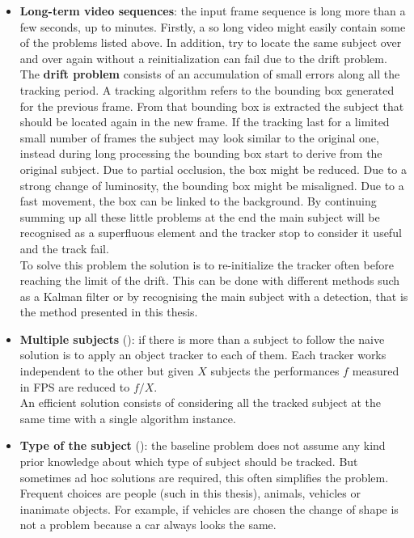 \begin{itemize}
	\item \textbf{Long-term video sequences}: the input frame sequence is long more than a few seconds, up to minutes. Firstly, a so long video might easily contain some of the problems listed above. In addition, try to locate the same subject over and over again without a reinitialization can fail due to the drift problem.\\
	The \textbf{drift problem} consists of an accumulation of small errors along all the tracking period. A tracking algorithm refers to the bounding box generated for the previous frame. From that bounding box is extracted the subject that should be located again in the new frame. If the tracking last for a limited small number of frames the subject may look similar to the original one, instead during long processing the bounding box start to derive from the original subject. Due to partial occlusion, the box might be reduced. Due to a strong change of luminosity, the bounding box might be misaligned. Due to a fast movement, the box can be linked to the background. By continuing summing up all these little problems at the end the main subject will be recognised as a superfluous element and the tracker stop to consider it useful and the track fail.\\
	To solve this problem the solution is to re-initialize the tracker often before reaching the limit of the drift. This can be done with different methods such as a Kalman filter or by recognising the main subject with a detection, that is the method presented in this thesis.
	
	\item \textbf{Multiple subjects} (): if there is more than a subject to follow the naive solution is to apply an object tracker to each of them. Each tracker works independent to the other but given $X$ subjects the performances $f$ measured in FPS are reduced to $f/X$.\\
	An efficient solution consists of considering all the tracked subject at the same time with a single algorithm instance.
	
	\item \textbf{Type of the subject} (): the baseline problem does not assume any kind prior knowledge about which type of subject should be tracked. But sometimes ad hoc solutions are required, this often simplifies the problem. Frequent choices are people (such in this thesis), animals, vehicles or inanimate objects. For example, if vehicles are chosen the change of shape is not a problem because a car always looks the same.
	
\end{itemize}
